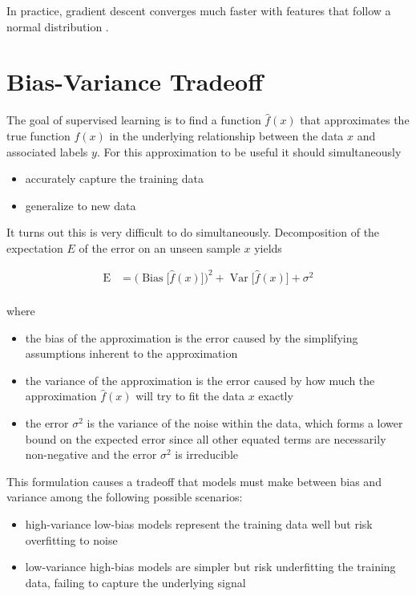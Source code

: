 In practice, gradient descent converges much faster with features that follow a normal distribution \cite{batchnormalization}.


\section{Bias-Variance Tradeoff}

The goal of supervised learning is to find a function $\hat{f}(x)$ that approximates the true function $f(x)$ in the underlying relationship between the data $x$ and associated labels $y$. For this approximation to be useful it should simultaneously

\begin{itemize}
    \item accurately capture the training data
    \item generalize to new data
\end{itemize}

It turns out this is very difficult to do simultaneously. Decomposition of the expectation $E$ of the error on an unseen sample $x$ yields

$$
{\displaystyle {\begin{aligned}\operatorname {E} &={\Big (}\operatorname {Bias} {\big [}{\hat {f}}(x){\big ]}{\Big )}^{2}+\operatorname {Var} {\big [}{\hat {f}}(x){\big ]}+\sigma ^{2}\\\end{aligned}}}
$$

where

\begin{itemize}
    \item the bias of the approximation is the error caused by the simplifying assumptions inherent to the approximation
    \item the variance of the approximation is the error caused by how much the approximation $\hat{f}(x)$ will try to fit the data $x$ exactly
    \item the error $\sigma^2$ is the variance of the noise within the data, which forms a lower bound on the expected error since all other equated terms are necessarily non-negative and the error $\sigma^2$ is irreducible
\end{itemize}

This formulation causes a tradeoff that models must make between bias and variance among the following possible scenarios:

\begin{itemize}
    \item high-variance low-bias models represent the training data well but risk overfitting to noise
    \item low-variance high-bias models are simpler but risk underfitting the training data, failing to capture the underlying signal
\end{itemize}

